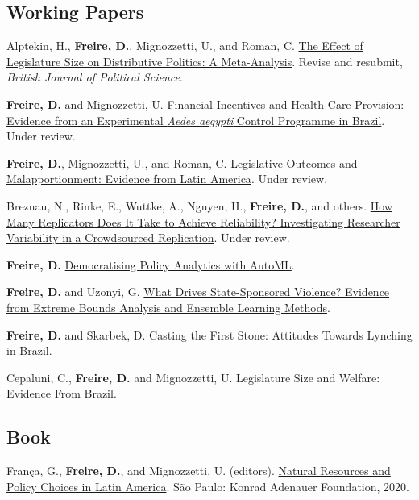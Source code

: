 \documentclass[a4paper]{article}
\renewenvironment{itemize}{
	\begin{list}{}{
			\setlength{\leftmargin}{1.5em}
		}
		}{
	\end{list}
}
\begin{document}
\subsection*{Working Papers}

\begin{itemize}
\item Alptekin, H., \textbf{Freire, D.}, Mignozzetti, U., and Roman, C. \href{https://doi.org/10.31235/osf.io/xf7wp}{The Effect of Legislature Size on Distributive Politics: A Meta-Analysis}. Revise and resubmit, \textit{British Journal of Political Science}.
\item \textbf{Freire, D.} and Mignozzetti, U. \href{https://github.com/danilofreire/incentives-healthcare}{Financial Incentives and Health Care Provision: Evidence from an Experimental \textit{Aedes aegypti} Control Programme in Brazil}. Under review.
\item \textbf{Freire, D.}, Mignozzetti, U., and Roman, C. \href{https://github.com/danilofreire/danilofreire.github.io/blob/master/malapportionment.pdf}{Legislative Outcomes and Malapportionment: Evidence from Latin America}. Under review.
\item Breznau, N., Rinke, E., Wuttke, A., Nguyen, H., \textbf{Freire, D.}, and others. \href{https://osf.io/preprints/socarxiv/j7qta/}{How Many Replicators Does It Take to Achieve Reliability? Investigating Researcher Variability in a Crowdsourced Replication}. Under review.
\item \textbf{Freire, D.} \href{https://github.com/danilofreire/mercatus-analytics-papers/automl-paper}{Democratising Policy Analytics with AutoML}. 
\item \textbf{Freire, D.} and Uzonyi, G. \href{https://osf.io/pzx3q}{What Drives State-Sponsored Violence? Evidence from Extreme Bounds Analysis and Ensemble Learning Methods}.
\item \textbf{Freire, D.} and Skarbek, D. Casting the First Stone: Attitudes Towards Lynching in Brazil.
\item Cepaluni, C., \textbf{Freire, D.} and Mignozzetti, U. Legislature Size and Welfare: Evidence From Brazil. 
\end{itemize}

\subsection*{Book}

\begin{itemize}
\item França, G., \textbf{Freire, D.}, and Mignozzetti, U. (editors). \href{https://github.com/danilofreire/danilofreire.github.io/blob/master/natural_resources_policy_choices_latam.pdf}{Natural Resources and Policy Choices in Latin America}. São Paulo: Konrad Adenauer Foundation, 2020.
\end{itemize}
\end{document}
